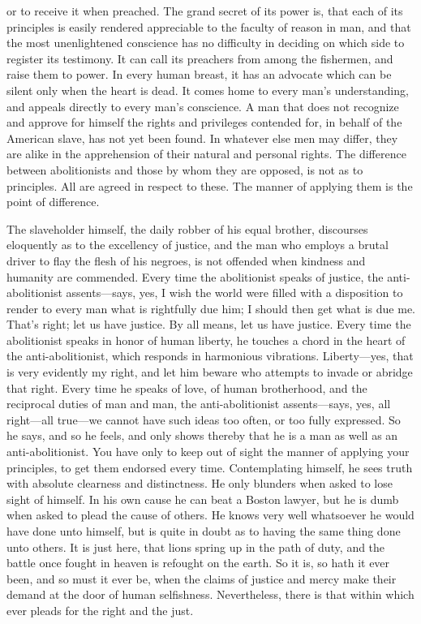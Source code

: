 or to receive it when preached. The grand secret of its power is, that
each of its principles is easily rendered appreciable to the faculty of
reason in man, and that the most unenlightened conscience has no
difficulty in deciding on which side to register its testimony. It can
call its preachers from among the fishermen, and raise them to power. In
every human breast, it has an advocate which can be silent only when the
heart is dead. It comes home to every man's understanding, and appeals
directly to every man's conscience. A man that does not recognize and
approve for himself the rights and privileges contended for, in behalf
of the American slave, has not yet been found. In whatever else men may
differ, they are alike in the apprehension of their natural and personal
rights. The difference between abolitionists and those by whom they are
opposed, is not as to principles. All are agreed in respect to these.
The manner of applying them is the point of difference.

The slaveholder himself, the daily robber of his equal brother,
discourses eloquently as to the excellency of justice, and the man who
employs a brutal driver to flay the flesh of his negroes, is not
offended when kindness and humanity are commended. Every time the
abolitionist speaks of justice, the anti-abolitionist assents---says,
yes, I wish the world were filled with a disposition to render to every
man what is rightfully due him; I should then get what is due me. That's
right; let us have justice. By all means, let us have justice. Every
time the abolitionist speaks in honor of human liberty, he touches a
chord in the heart of the anti-abolitionist, which responds in
harmonious vibrations. Liberty---yes,
{\protect\hypertarget{461}{}{}}that is very evidently my right, and let
him beware who attempts to invade or abridge that right. Every time he
speaks of love, of human brotherhood, and the reciprocal duties of man
and man, the anti-abolitionist assents---says, yes, all right---all
true---we cannot have such ideas too often, or too fully expressed. So
he says, and so he feels, and only shows thereby that he is a man as
well as an anti-abolitionist. You have only to keep out of sight the
manner of applying your principles, to get them endorsed every time.
Contemplating himself, he sees truth with absolute clearness and
distinctness. He only blunders when asked to lose sight of himself. In
his own cause he can beat a Boston lawyer, but he is dumb when asked to
plead the cause of others. He knows very well whatsoever he would have
done unto himself, but is quite in doubt as to having the same thing
done unto others. It is just here, that lions spring up in the path of
duty, and the battle once fought in heaven is refought on the earth. So
it is, so hath it ever been, and so must it ever be, when the claims of
justice and mercy make their demand at the door of human selfishness.
Nevertheless, there is that within which ever pleads for the right and
the just.

